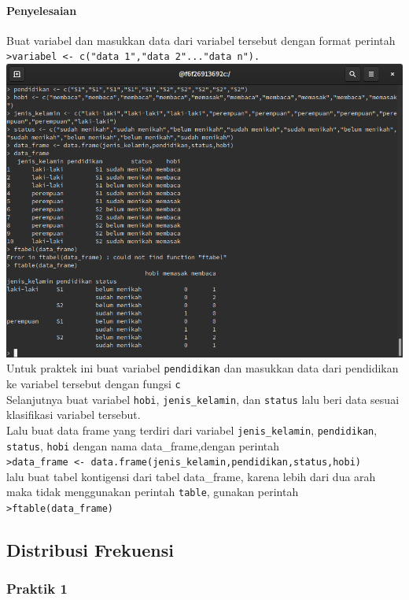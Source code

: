 \documentclass[a4paper,12pt]{article}
\begin{document}
\paragraph{Penyelesaian\\}
Buat variabel dan masukkan data dari variabel tersebut dengan format perintah\\ \texttt{>variabel <- c("data 1","data 2"..."data n").}\\
\includegraphics[width=\linewidth]{2}\\
Untuk praktek ini buat variabel \texttt{pendidikan} dan masukkan data dari pendidikan ke variabel tersebut dengan fungsi \texttt{c}\\
Selanjutnya buat variabel \texttt{hobi}, \texttt{jenis\_kelamin}, dan \texttt{status} lalu beri data sesuai klasifikasi variabel tersebut.\\
Lalu buat data frame yang terdiri dari variabel \texttt{jenis\_kelamin}, \texttt{pendidikan}, \texttt{status}, \texttt{hobi} dengan nama data\_frame,dengan perintah\\ 
\texttt{>data\_frame <- data.frame(jenis\_kelamin,pendidikan,status,hobi)}\\
lalu buat tabel kontigensi dari tabel data\_frame, karena lebih dari dua arah maka tidak menggunakan perintah \texttt{table}, gunakan perintah\\
\texttt{>ftable(data\_frame)}

\subsection{Distribusi Frekuensi}
\subsubsection{Praktik 1}
\end{document}
